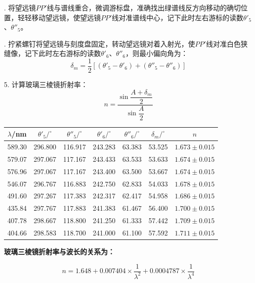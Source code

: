 \documentclass[fontset=windows]{ctexbook}
\begin{document}
. 将望远镜$PP'$线与谱线重合，微调游标盘，准确找出绿谱线反方向移动的确切位置，轻轻移动望远镜，使望远镜$PP'$线对准谱线中心，记下此时左右游标的读数$\theta'_5$、$\theta''_5$。

. 拧紧螺钉将望远镜与刻度盘固定，转动望远镜对着入射光，使$PP'$线对准白色狭缝像，记下此时左右游标的读数$\theta'_6$、$\theta''_6$，则最小偏向角为：
\[
    \delta_m = \frac{1}{2}[(\theta'_5 - \theta'_6) + (\theta''_5 - \theta''_6)]
\]

5. 计算玻璃三棱镜折射率：
\[
    n = \dfrac{\sin\dfrac{A+\delta_m}{2}}{\sin\dfrac{A}{2}}
\]

\begin{table}[ht!]\Large
    \begin{center}
            \begin{tabular}{|c|c|c|c|c|c|c|}
            \hline
            $\lambda$/nm & $\theta'_5/^{\circ}$ & $\theta''_5/^{\circ}$ & $\theta'_6/^{\circ}$ & $\theta''_6/^{\circ}$ & $\delta_m/^{\circ}$ & $n$ \\
            \hline
            589.30 & 296.800 & 116.917 & 243.283 & 63.383 & 53.525 & $1.673\pm0.015$ \\
            \hline
            579.07 & 297.067 & 117.167 & 243.433 & 63.533 & 53.633 & $1.674\pm0.015$ \\
            \hline
            576.96 & 297.067 & 117.167 & 243.400 & 63.500 & 53.667 & $1.674\pm0.015$ \\
            \hline
            546.07 & 296.767 & 116.883 & 242.750 & 62.833 & 54.033 & $1.678\pm0.015$ \\
            \hline
            491.60 & 297.267 & 117.383 & 242.317 & 62.417 & 54.958 & $1.686\pm0.015$ \\
            \hline
            435.84 & 297.767 & 117.883 & 241.383 & 61.467 & 56.400 & $1.700\pm0.015$ \\
            \hline
            407.78 & 298.667 & 118.800 & 241.250 & 61.333 & 57.442 & $1.709\pm0.015$ \\
            \hline
            404.66 & 298.583 & 118.700 & 241.000 & 61.100 & 57.592 & $1.711\pm0.015$ \\
            \hline
            \end{tabular}
    \end{center}
\end{table}

\textbf{玻璃三棱镜折射率与波长的关系为：}

\[
    n = 1.648+0.007404\times\frac{1}{\lambda^2}+0.0004787\times\frac{1}{\lambda^4}
\]
\end{document}
